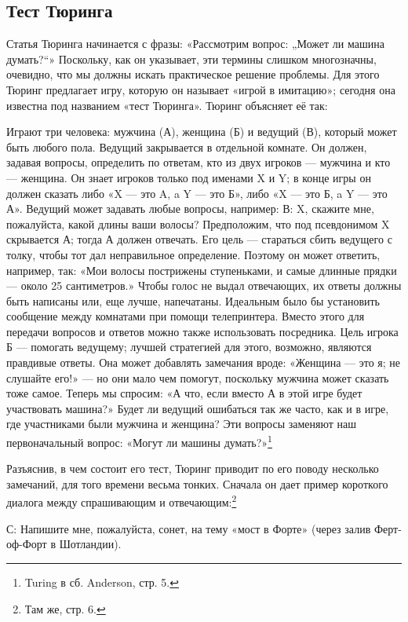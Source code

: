 \documentclass[../main.tex]{subfiles}
\begin{document}
\subsection{Тест Тюринга}

Статья Тюринга начинается с фразы: «Рассмотрим вопрос: „Может ли машина думать?{}``» Поскольку, как он указывает, эти термины слишком многозначны, очевидно, что мы должны искать практическое решение проблемы. Для этого Тюринг предлагает игру, которую он называет «игрой в имитацию»; сегодня она известна под названием «тест Тюринга». Тюринг объясняет её так:

Играют три человека: мужчина (А), женщина (Б) и ведущий (В), который может быть любого пола. Ведущий закрывается в отдельной комнате. Он должен, задавая вопросы, определить по ответам, кто из двух игроков --- мужчина и кто --- женщина. Он знает игроков только под именами X и Y; в конце игры он должен сказать либо «X --- это A, a Y --- это Б», либо «X --- это Б, a Y --- это А». Ведущий может задавать любые вопросы, например: В: X, скажите мне, пожалуйста, какой длины ваши волосы? Предположим, что под псевдонимом X скрывается А; тогда А должен отвечать. Его цель --- стараться сбить ведущего с толку, чтобы тот дал неправильное определение. Поэтому он может ответить, например, так: «Мои волосы пострижены ступеньками, и самые длинные прядки --- около 25 сантиметров.» Чтобы голос не выдал отвечающих, их ответы должны быть написаны или, еще лучше, напечатаны. Идеальным было бы установить сообщение между комнатами при помощи телепринтера. Вместо этого для передачи вопросов и ответов можно также использовать посредника. Цель игрока Б --- помогать ведущему; лучшей стратегией для этого, возможно, являются правдивые ответы. Она может добавлять замечания вроде: «Женщина --- это я; не слушайте его!» --- но они мало чем помогут, поскольку мужчина может сказать тоже самое. Теперь мы спросим: «А что, если вместо А в этой игре будет участвовать машина?» Будет ли ведущий ошибаться так же часто, как и в игре, где участниками были мужчина и женщина? Эти вопросы заменяют наш первоначальный вопрос: «Могут ли машины думать?»\footnote{Turing в сб. Anderson, стр. 5.}

Разъяснив, в чем состоит его тест, Тюринг приводит по его поводу несколько замечаний, для того времени весьма тонких. Сначала он дает пример короткого диалога между спрашивающим и отвечающим:\footnote{Там же, стр. 6.}

С: Напишите мне, пожалуйста, сонет, на тему «мост в Форте» (через залив Ферт-оф-Форт в Шотландии).
\end{document}
